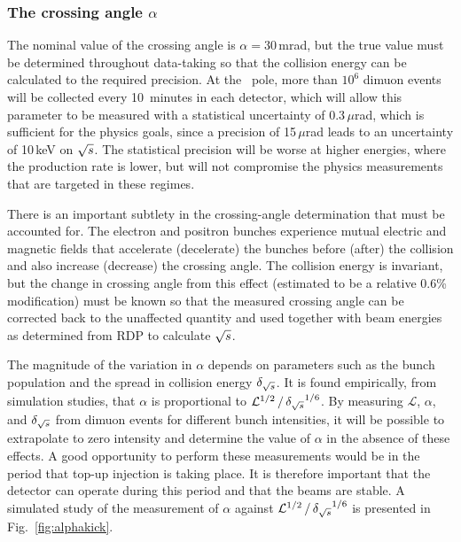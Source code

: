 \subsubsection{The crossing angle \texorpdfstring{$\alpha$}{alpha}}

The nominal value of the crossing angle is $\alpha = 30$\,mrad, but the true value must be determined throughout data-taking so that the collision energy can be calculated to the required precision.   
At the \PZ~pole, more than $10^6$ dimuon events will be collected every 10~minutes in each detector, which will allow this parameter to be measured with a statistical uncertainty of 0.3\,$\mu$rad, which is sufficient for the physics goals, since a precision of 15\,$\mu$rad leads to an uncertainty of 10\,keV on $\sqrt{s}$.   
The statistical precision will be worse at higher energies, where the production rate is lower, but will not compromise the physics measurements that are targeted in these regimes.

There is an important subtlety in the crossing-angle determination that must be accounted for.  
The electron and positron bunches experience mutual electric and magnetic fields that accelerate (decelerate) the bunches before (after) the collision and  also increase (decrease) the crossing angle.  
The collision energy is invariant, but the change in crossing angle from this effect (estimated to be a relative 0.6\% modification) must be known so that the measured crossing angle can be corrected back to the unaffected quantity and used together with beam energies as determined from RDP to calculate $\sqrt{s}$.

The magnitude of the variation in $\alpha$ depends on parameters such as the bunch population and the spread in collision energy  $\delta_{\sqrt{s}}$.  
It is found empirically, from simulation studies, that $\alpha$ is proportional to $\mathcal{L}^{1/2} \,/\, {\delta_{\sqrt{s}}}^{1/6}$.  
By measuring $\mathcal{L}$, $\alpha$, and $\delta_{\sqrt{s}}$ from dimuon events for different bunch intensities, it will be possible to extrapolate to zero intensity and determine the value of $\alpha$ in the absence of these effects.  
A good opportunity to perform these measurements would be in the period that top-up injection is taking place.
It is therefore important that the detector can operate during this period and that the beams are stable.  
A simulated study of the measurement of $\alpha$ against $\mathcal{L}^{1/2} \,/\, {\delta_{\sqrt{s}}}^{1/6}$ is presented in Fig.~\ref{fig:alphakick}.

